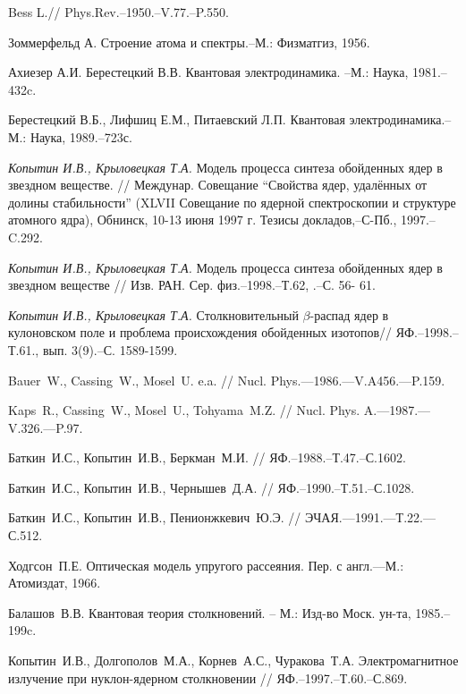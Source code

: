 \begin{thebibliography}{200}
Bess L.// Phys.Rev.--1950.--V.77.--P.550.


Зоммерфельд А. Строение атома и спектры.--М.: Физматгиз, 1956.


Ахиезер А.И. Берестецкий В.В. Квантовая электродинамика. --М.: Наука, 1981.--432c.


Берестецкий В.Б., Лифшиц Е.М., Питаевский Л.П. Квантовая электродинамика.--
М.: Наука, 1989.--723с.

\textit{Копытин И.В., Крыловецкая Т.А.} Модель процесса синтеза обойденных
ядер в звездном веществе. // Междунар. Совещание ``Свойства ядер,
удалённых от долины стабильности'' (XLVII Совещание по ядерной
спектроскопии и структуре атомного ядра), Обнинск, 10-13 июня 1997 г.
Тезисы докладов,--С-Пб., 1997.--C.292.

\textit{Копытин И.В., Крыловецкая Т.А.} Модель процесса синтеза обойденных
ядер в звездном веществе // Изв. РАН. Сер. физ.--1998.--Т.62, .--С. 56-
61.

\textit{Копытин И.В., Крыловецкая Т.А.} Столкновительный  $\beta$-распад ядер в
кулоновском поле и проблема происхождения обойденных изотопов//
ЯФ.--1998.--Т.61., вып. 3(9).--С. 1589-1599.



Bauer~W., Cassing~W., Mosel~U. e.a. // Nucl. Phys.---1986.---V.A456.---P.159.

Kaps~R., Cassing~W., Mosel~U., Tohyama~M.Z. // Nucl. Phys. A.---1987.---V.326.---P.97.


Баткин~И.С., Копытин~И.В., Беркман~М.И. // ЯФ.--1988.--Т.47.--С.1602.



Баткин~И.С., Копытин~И.В., Чернышев~Д.А. // ЯФ.--1990.--Т.51.--С.1028.

Баткин~И.С., Копытин~И.В., Пенионжкевич~Ю.Э. // ЭЧАЯ.---1991.---Т.22.---С.512.


Ходгсон~П.Е. Оптическая модель упругого рассеяния. Пер. с англ.---М.: Атомиздат, 1966.

Балашов~В.В. Квантовая теория столкновений. -- М.: Изд-во Моск. ун-та, 1985.--199c.


Копытин~И.В., Долгополов~М.А., Корнев~А.С., Чуракова~Т.А.
Электромагнитное излучение при нуклон-ядерном столкновении
// ЯФ.--1997.--Т.60.--С.869.


\end{thebibliography}

